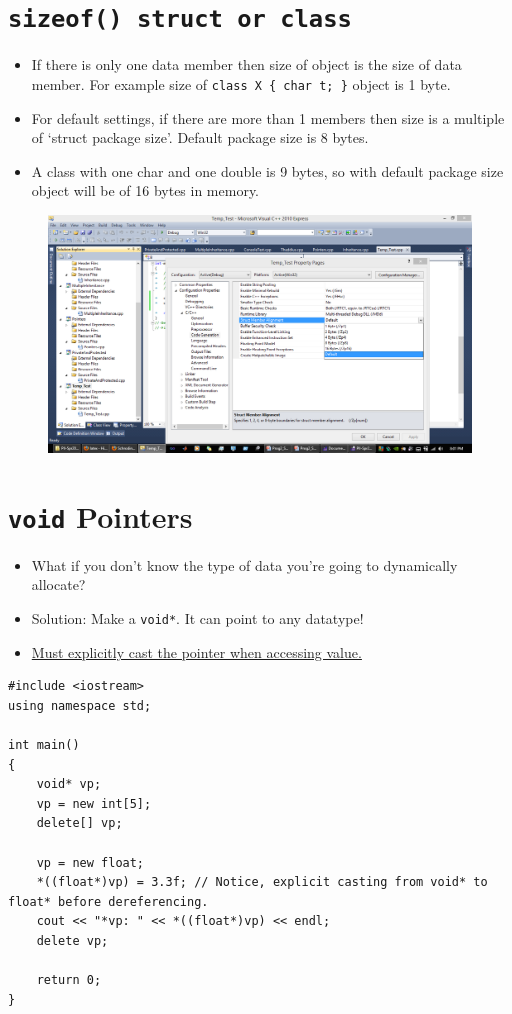 \documentclass[12pt,a4paper]{article}
\begin{document}
\section{\texttt{sizeof() struct or class}}
\begin{itemize}
\item If there is only one data member then size of object is the size of data member. For example size of \verb|class X { char t; }| object is 1 byte.
\item For default settings, if there are more than 1 members then size is a multiple of `struct package size'. Default package size is 8 bytes.
\item A class with one char and one double is 9 bytes, so with default package size object will be of 16 bytes in memory.
\end{itemize}
\begin{figure}[H]
\includegraphics[width=\textwidth]{StructPackagingSize}
\end{figure}
\section{\texttt{void} Pointers}
\begin{itemize}
\item What if you don't know the type of data you're going to dynamically allocate?
\item Solution: Make a \verb|void*|. It can point to any datatype!
\item \underline{Must explicitly cast the pointer when accessing value.}
\end{itemize}
\begin{lstlisting}[caption={\texttt{void*} usage}]
#include <iostream>
using namespace std;

int main()
{
	void* vp;
	vp = new int[5];
	delete[] vp;

	vp = new float;
	*((float*)vp) = 3.3f; // Notice, explicit casting from void* to float* before dereferencing.
	cout << "*vp: " << *((float*)vp) << endl;
	delete vp;

	return 0;
}
\end{lstlisting}
\end{document}
